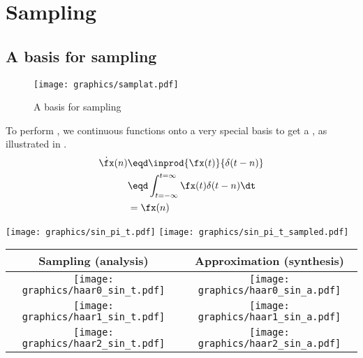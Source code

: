 ﻿%
\chapter{Sampling}

\section{A basis for sampling}
\begin{figure}[h]
  \centering
  \texttt{[image: graphics/samplat.pdf]}
\caption{A basis for sampling \label{fig:samplat}}
\end{figure}
  To perform , we  
  continuous functions onto a very special basis
  to get a , as illustrated in .
\begin{align*}
  \dot{\fx}(n)
    &\eqd \inprod{\fx(t)}{\delta(t-n)}
  \\&\eqd \int_{t=-\infty}^{t=\infty} \fx(t)\delta(t-n) \dt
  \\&=    \fx(n)
\end{align*}


\texttt{[image: graphics/sin\_pi\_t.pdf]}
\texttt{[image: graphics/sin\_pi\_t\_sampled.pdf]}


  \begin{tabular}{|c|c|}
    \hline
    Sampling (analysis) & Approximation (synthesis)
    \\\hline\hline
      \texttt{[image: graphics/haar0\_sin\_t.pdf]}
    & \texttt{[image: graphics/haar0\_sin\_a.pdf]}
    \\\hline
      \texttt{[image: graphics/haar1\_sin\_t.pdf]}
    & \texttt{[image: graphics/haar1\_sin\_a.pdf]}
    \\\hline
      \texttt{[image: graphics/haar2\_sin\_t.pdf]}
    & \texttt{[image: graphics/haar2\_sin\_a.pdf]}
    \\\hline
  \end{tabular}

